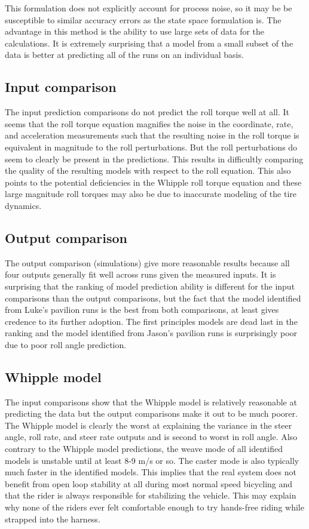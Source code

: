 \documentclass[a4paper]{article}
\begin{document}
This formulation does not explicitly account for process noise, so it may be be
susceptible to similar accuracy errors as the state space formulation is. The
advantage in this method is the ability to use large sets of data for the
calculations. It is extremely surprising that a model from a small subset of
the data is better at predicting all of the runs on an individual basis.

\subsection{Input comparison}

The input prediction comparisons do not predict the roll torque well at all. It
seems that the roll torque equation magnifies the noise in the coordinate,
rate, and acceleration measurements such that the resulting noise in the roll
torque is equivalent in magnitude to the roll perturbations. But the roll
perturbations do seem to clearly be present in the predictions. This results in
difficultly comparing the quality of the resulting models with respect to the
roll equation. This also points to the potential deficiencies in the Whipple
roll torque equation and these large magnitude roll torques may also be due to
inaccurate modeling of the tire dynamics.

\subsection{Output comparison}

The output comparison (simulations) give more reasonable results because
all four outputs generally fit well across runs given the measured
inputs. It is surprising that the ranking of model prediction ability is
different for the input comparisons than the output comparisons, but the
fact that the model identified from Luke's pavilion runs is the best
from both comparisons, at least gives credence to its further adoption.
The first principles models are dead last in the ranking and the model
identified from Jason's pavilion runs is surprisingly poor due to poor
roll angle prediction.

\subsection{Whipple model}

The input comparisons show that the Whipple model is relatively
reasonable at predicting the data but the output comparisons make it out
to be much poorer. The Whipple model is clearly the worst at explaining
the variance in the steer angle, roll rate, and steer rate outputs and
is second to worst in roll angle. Also contrary to the Whipple model
predictions, the weave mode of all identified models is unstable until
at least 8-9 m/s or so. The caster mode is also typically much faster in
the identified models. This implies that the real system does not
benefit from open loop stability at all during most normal speed
bicycling and that the rider is always responsible for stabilizing the
vehicle. This may explain why none of the riders ever felt comfortable
enough to try hands-free riding while strapped into the harness.
\end{document}
